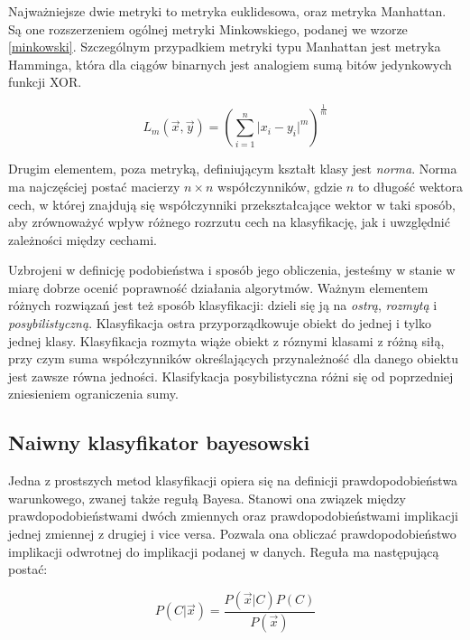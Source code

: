 \documentclass[12pt,a4paper,oneside]{report} %
\begin{document}
Najważniejsze dwie metryki to metryka euklidesowa, oraz metryka Manhattan. Są one rozszerzeniem ogólnej metryki Minkowskiego, podanej we wzorze \ref{minkowski}. Szczególnym przypadkiem metryki typu Manhattan jest metryka Hamminga, która dla ciągów binarnych jest analogiem sumą bitów jedynkowych funkcji XOR. \par

\begin{equation}
L_m(\vec{x},\vec{y}) = (\sum\limits_{i=1}^{n} \lvert x_i - y_i \rvert ^m)^{\frac{1}{m}}
\end{equation}
\label{minkowski}

Drugim elementem, poza metryką, definiującym kształt klasy jest \emph{norma}. Norma ma najczęściej postać macierzy $n \times n$ współczynników, gdzie $n$ to długość wektora cech, w której znajdują się współczynniki przekształcające wektor w taki sposób, aby zrównoważyć wpływ różnego rozrzutu cech na klasyfikację, jak i uwzględnić zależności między cechami. \cite{rutkowski} \par

Uzbrojeni w definicję podobieństwa i sposób jego obliczenia, jesteśmy w stanie w miarę dobrze ocenić poprawność działania algorytmów. Ważnym elementem różnych rozwiązań jest też sposób klasyfikacji: dzieli się ją na \emph{ostrą}, \emph{rozmytą} i \emph{posybilistyczną}. Klasyfikacja ostra przyporządkowuje obiekt do jednej i tylko jednej klasy. Klasyfikacja rozmyta wiąże obiekt z róznymi klasami z różną siłą, przy czym suma współczynników określających przynależność dla danego obiektu jest zawsze równa jedności. Klasifykacja posybilistyczna różni się od poprzedniej zniesieniem ograniczenia sumy.\par


\subsection{Naiwny klasyfikator bayesowski}

Jedna z prostszych metod klasyfikacji opiera się na definicji prawdopodobieństwa warunkowego, zwanej także regułą Bayesa. Stanowi ona związek między prawdopodobieństwami dwóch zmiennych oraz prawdopodobieństwami implikacji jednej zmiennej z drugiej i vice versa. Pozwala ona obliczać prawdopodobieństwo implikacji odwrotnej do implikacji podanej w danych. Reguła ma następującą postać:\par

\begin{equation}
P(C|\vec{x}) = \frac{P(\vec{x}|C)P(C)}{P(\vec{x})}
\end{equation}
\end{document}
